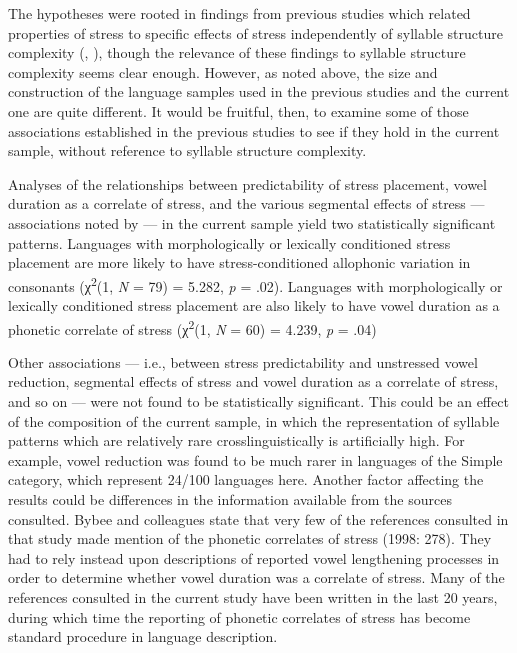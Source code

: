   The hypotheses were rooted in findings from previous studies which related properties of stress to specific effects of stress independently of syllable structure complexity (\citealt{BybeeEtAl1998}, \citealt{Schiering2007}), though the relevance of these findings to syllable structure complexity seems clear enough. However, as noted above, the size and construction of the language samples used in the previous studies and the current one are quite different. It would be fruitful, then, to examine some of those associations established in the previous studies to see if they hold in the current sample, without reference to syllable structure complexity.

  Analyses of the relationships between predictability of stress placement, vowel duration as a correlate of stress, and the various segmental effects of stress — associations noted by \citet{BybeeEtAl1998} — in the current sample yield two statistically significant patterns. Languages with morphologically or lexically conditioned stress placement are more likely to have stress-conditioned allophonic variation in consonants (χ\textsuperscript{2}(1, \textit{N} = 79) = 5.282, \textit{p} = .02). Languages with morphologically or lexically conditioned stress placement are also likely to have vowel duration as a phonetic correlate of stress (χ\textsuperscript{2}(1, \textit{N} = 60) = 4.239, \textit{p} = .04)

  Other associations — i.e., between stress predictability and unstressed vowel reduction, segmental effects of stress and vowel duration as a correlate of stress, and so on — were not found to be statistically significant. This could be an effect of the composition of the current sample, in which the representation of syllable patterns which are relatively rare crosslinguistically is artificially high. For example, vowel reduction was found to be much rarer in languages of the Simple category, which represent 24/100 languages here. Another factor affecting the results could be differences in the information available from the sources consulted. Bybee and colleagues state that very few of the references consulted in that study made mention of the phonetic correlates of stress (1998: 278). They had to rely instead upon descriptions of reported vowel lengthening processes in order to determine whether vowel duration was a correlate of stress. Many of the references consulted in the current study have been written in the last 20 years, during which time the reporting of phonetic correlates of stress has become standard procedure in language description.

